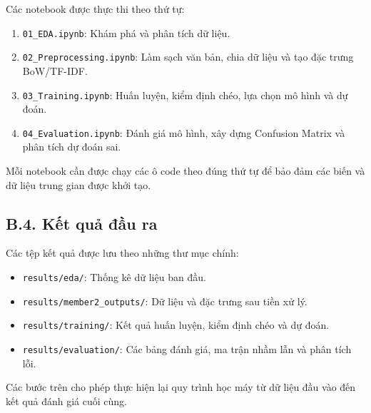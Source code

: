 Các notebook được thực thi theo thứ tự:

\begin{enumerate}

    \item \texttt{01\_EDA.ipynb}:
    Khám phá và phân tích dữ liệu.

    \item \texttt{02\_Preprocessing.ipynb}:
    Làm sạch văn bản, chia dữ liệu
    và tạo đặc trưng BoW/TF-IDF.

    \item \texttt{03\_Training.ipynb}:
    Huấn luyện, kiểm định chéo,
    lựa chọn mô hình và dự đoán.

    \item \texttt{04\_Evaluation.ipynb}:
    Đánh giá mô hình,
    xây dựng Confusion Matrix
    và phân tích dự đoán sai.

\end{enumerate}

Mỗi notebook cần được chạy các ô code
theo đúng thứ tự để bảo đảm các biến
và dữ liệu trung gian được khởi tạo.

\subsection*{B.4. Kết quả đầu ra}

Các tệp kết quả được lưu theo
những thư mục chính:

\begin{itemize}

    \item \texttt{results/eda/}:
    Thống kê dữ liệu ban đầu.

    \item \texttt{results/member2\_outputs/}:
    Dữ liệu và đặc trưng sau tiền xử lý.

    \item \texttt{results/training/}:
    Kết quả huấn luyện,
    kiểm định chéo và dự đoán.

    \item \texttt{results/evaluation/}:
    Các bảng đánh giá,
    ma trận nhầm lẫn và phân tích lỗi.

\end{itemize}

Các bước trên cho phép thực hiện lại
quy trình học máy từ dữ liệu đầu vào
đến kết quả đánh giá cuối cùng.



